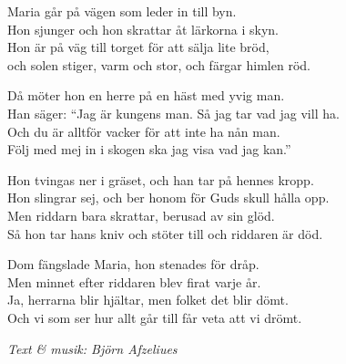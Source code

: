 \vspace{10pt}
Maria går på vägen som leder in till byn.\\
Hon sjunger och hon skrattar åt lärkorna i skyn.\\
Hon är på väg till torget för att sälja lite bröd,\\ 
och solen stiger, varm och stor, och färgar himlen röd.\par
\vspace{10pt}
Då möter hon en herre på en häst med yvig man.\\
Han säger: ``Jag är kungens man. Så jag tar vad jag vill ha.\\ 
Och du är alltför vacker för att inte ha nån man.\\
Följ med mej in i skogen ska jag visa vad jag kan.''\par
\vspace{10pt}
Hon tvingas ner i gräset, och han tar på hennes kropp.\\
Hon slingrar sej, och ber honom för Guds skull hålla opp.\\
Men riddarn bara skrattar, berusad av sin glöd.\\
Så hon tar hans kniv och stöter till och riddaren är död.\par
\vspace{10pt}
Dom fängslade Maria, hon stenades för dråp.\\
Men minnet efter riddaren blev firat varje år.\\
Ja, herrarna blir hjältar, men folket det blir dömt.\\
Och vi som ser hur allt går till får veta att vi drömt.\par
\vspace{10pt}
{\footnotesize\textit{Text \& musik: Björn Afzeliues}}
